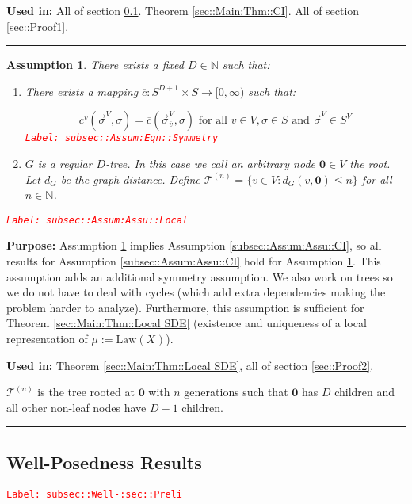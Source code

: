 \documentclass[12pt]{article}
\newcommand{\mb}{\mathbb}
\newcommand{\mc}{\mathcal}
\newcommand{\ra}{\rightarrow}
\newcommand{\ov}{\overline}
\newcommand{\te}{\text}
\newcommand{\tr}{\textcolor{red}}
\newcommand{\labe}[1]{\tr{\texttt{Label: #1}}}
\newcommand{\purpose}{\textbf{Purpose: }}
\newcommand{\usein}{\textbf{Used in: }}
\newcommand{\ind}{\hspace{24pt}}
\newcommand{\lin}{\rule{\linewidth}{0.4 pt}}
\newcommand{\defeq}{:=}								%
\renewcommand{\root}{\mathbf{0}}				%
\renewcommand{\v}{v}							%
\renewcommand{\S}{S}							%
\newcommand{\s}{\sigma}							%
\newcommand{\sv}{\vec{\s}}						%
\newcommand{\X}{X}								%
\newcommand{\IGr}{c}							%
\newcommand{\vind}[1]{^{#1}}					%
\newcommand{\carp}[1]{^{#1}}					%
\newcommand{\vsi}[1]{^{#1}}						%
\newcommand{\cind}[1]{_{#1}}					%
\newcommand{\cl}{\ov}							%
\newcommand{\tip}[1]{#1}						%
\newcommand{\degr}{D}							%
\newcommand{\IGrg}{\ov{c}}						%
\newcommand{\gdist}{d_G}						%
\newcommand{\tree}{\mc{T}}						%
\newcommand{\sln}[1]{^{(#1)}}						%
\newcommand{\m}{\mu}							%
\newcommand{\law}{\te{Law}}						%
\newtheorem{assu}[thms]{Assumption}
\begin{document}
\usein All of section \ref{subsec::Well-:sec::Preli}. Theorem \ref{sec::Main:Thm::CI}. All of section \ref{sec::Proof1}.

\lin

\begin{assu}
There exists a fixed \(\degr\in \mb{N}\) such that:

\begin{enumerate}
\item There exists a mapping \(\IGrg: \S\carp{\degr+1} \times \S \ra [0,\infty)\) such that:

\begin{equation}
\IGr\vind{\v}(\sv\cind{}\vsi{V},\s) = \IGrg(\sv\cind{\cl{\v}}\vsi{V},\s) \te{ for all } \v\in V, \s\in \S\te{ and } \sv\cind{}\vsi{V} \in \S\carp{V}
\label{subsec::Assum:Eqn::Symmetry}
\end{equation}
\labe{subsec::Assum:Eqn::Symmetry}

\item \(G\) is a regular \(\degr\)-tree. In this case we call an arbitrary node \(\root\in V\) the root. Let \(\gdist\) be the graph distance. Define \(\tree\sln{n} = \{\v \in V: \gdist(\v,\root) \leq n\}\) for all \(n\in \mb{N}\).
\end{enumerate}
\label{subsec::Assum:Assu::Local}\labe{subsec::Assum:Assu::Local}
\end{assu}

\purpose Assumption \ref{subsec::Assum:Assu::Local} implies Assumption \ref{subsec::Assum:Assu::CI}, so all results for Assumption \ref{subsec::Assum:Assu::CI} hold for Assumption \ref{subsec::Assum:Assu::Local}. This assumption adds an additional symmetry assumption. We also work on trees so we do not have to deal with cycles (which add extra dependencies making the problem harder to analyze). Furthermore, this assumption is sufficient for Theorem \ref{sec::Main:Thm::Local SDE} (existence and uniqueness of a local representation of \(\m{}{}{} \defeq \law(\X\cind{}\tip{})\)).

\usein Theorem \ref{sec::Main:Thm::Local SDE}, all of section \ref{sec::Proof2}.

\ind \(\tree\sln{n}\) is the tree rooted at \(\root\) with \(n\) generations such that \(\root\) has \(\degr\) children and all other non-leaf nodes have \(\degr-1\) children.

\lin

\subsection{Well-Posedness Results}
\label{subsec::Well-:sec::Preli}\labe{subsec::Well-:sec::Preli}
\end{document}
